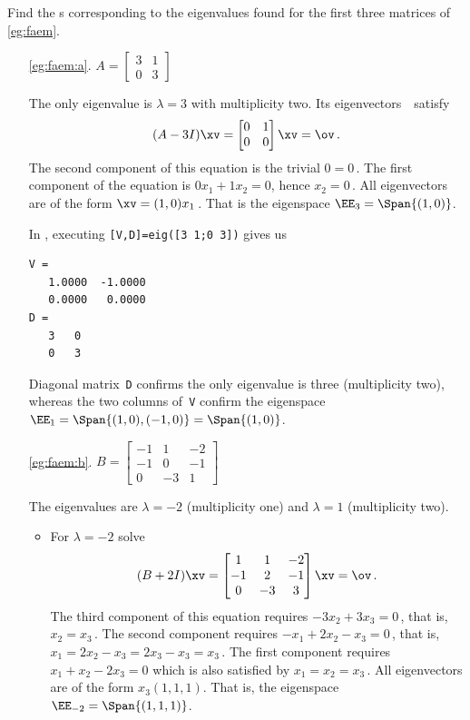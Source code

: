 \begin{example} \label{eg:faespm}
Find the s corresponding to the eigenvalues found for the first three matrices of \autoref{eg:faem}.
\begin{itemize}
\item[\ref{eg:faem:a}.]
\(A=\begin{bmatrix} 3&1\\0&3 \end{bmatrix}\)
\begin{solution} 
The only eigenvalue is \(\lambda=3\) with multiplicity two.
Its eigenvectors~\xv\ satisfy
\begin{equation*}
(A-3 I)\xv=\begin{bmatrix} 0&1\\0&0 \end{bmatrix}\xv=\ov\,.
\end{equation*}
The second component of this equation is the trivial \(0=0\)\,.  The first component of the equation is \(0x_1+1x_2=0\), hence \(x_2=0\)\,.
All eigenvectors are of the form \(\xv=(1,0)x_1\)\,.  
That is the eigenspace  \(\EE_3=\Span\{(1,0)\}\).

In \script, executing \verb|[V,D]=eig([3 1;0 3])| gives us
\begin{verbatim}
V =
   1.0000  -1.0000
   0.0000   0.0000
D =
   3   0
   0   3
\end{verbatim}
Diagonal matrix~\verb|D| confirms the only eigenvalue is three (multiplicity two), whereas the two columns of~\verb|V| confirm the eigenspace \(\EE_1=\Span\{(1,0),(-1,0)\}=\Span\{(1,0)\}\).
\end{solution}


\item[\ref{eg:faem:b}.]
\(B=\begin{bmatrix}-1&1&-2
\\-1&0&-1
\\0&-3&1 \end{bmatrix}\)
\begin{solution} 
The eigenvalues are \(\lambda=-2\) (multiplicity one) and \(\lambda=1\) (multiplicity two).
\begin{itemize}
\item For \(\lambda=-2\) solve
\begin{equation*}
(B+2I)\xv=\begin{bmatrix}1&1&-2
\\-1&2&-1
\\0&-3&3 \end{bmatrix}\xv=\ov\,.
\end{equation*}
The third component of this equation requires \(-3x_2+3x_3=0\)\,, that is, \(x_2=x_3\)\,.
The second component requires \(-x_1+2x_2-x_3=0\)\,, that is, \(x_1=2x_2-x_3=2x_3-x_3=x_3\)\,.
The first component requires \(x_1+x_2-2x_3=0\) which is also satisfied by \(x_1=x_2=x_3\)\,.
All eigenvectors are of the form \(x_3(1,1,1)\).
That is, the eigenspace \(\EE_{-2}=\Span\{(1,1,1)\}\).


\end{itemize}
\end{solution}
\end{itemize}
\end{example}
